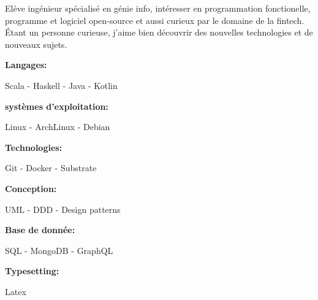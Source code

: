 \documentclass[10pt]{developercv} %
\begin{document}
\begin{minipage}[t]{0.4\textwidth} %
	
    \vspace{-\baselineskip} %
	
    {El\'eve ing\'enieur sp\'ecialis\'e en g\'enie info, int\'eresser en programmation fonctionelle,
        programme et logiciel open-source et aussi curieux par le domaine de la fintech.\\
    \'Etant un personne curieuse, j'aime bien d\'ecouvrir des nouvelles technologies et de nouveaux
    sujets.} 
\end{minipage}
\hfill %
\begin{minipage}[t]{0.575\textwidth} %
 
	\vspace{-\baselineskip} %
	    \begin{minipage}[t]{0.475 \textwidth}
	 		\textbf{Langages:}

    		{Scala - Haskell - Java - Kotlin}

    		\textbf{syst\`emes d'exploitation:}
	 		
    		{Linux - ArchLinux - Debian}
            
            \textbf{Technologies:}
            
            {Git - Docker - Substrate}
	    \end{minipage}
        \hfill
	    \begin{minipage}[t]{0.5 \textwidth}
	 		\textbf{Conception:}

            {UML - DDD - Design patterns}

	 		\textbf{Base de donn\'ee:}
            
            {SQL - MongoDB - GraphQL}
            
            \textbf{Typesetting:}

            {Latex}
        \end{minipage}
\end{minipage}


\end{document}
